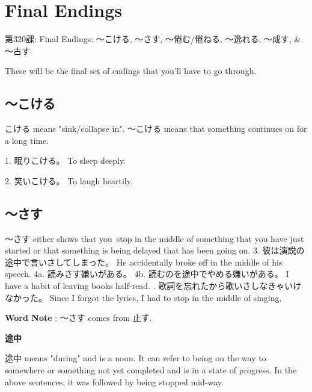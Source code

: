     
\chapter{Final Endings}

\begin{center}
\begin{Large}
第320課: Final Endings: ～こける, ～さす, ～倦む\slash 倦ねる, ～逸れる, ～成す, \& ～古す 
\end{Large}
\end{center}
 
\par{ These will be the final set of endings that you'll have to go through. }
      
\section{～こける}
 
\par{ こける means "sink\slash collapse in". ～こける means that something continues on for a long time. }

\par{1. 眠りこける。 \hfill\break
To sleep deeply. }

\par{2. 笑いこける。 \hfill\break
To laugh heartily. }
      
\section{～さす}
 
\par{ ～さす either shows that you stop in the middle of something that you have just started or that something is being delayed that has been going on. }
3. 彼は演説の途中で言いさしてしまった。 He accidentally broke off in the middle of his speech. \hfill\break
\hfill\break
4a. 読みさす嫌いがある。 4b. 読むのを途中でやめる嫌いがある。 I have a habit of leaving books half-read. \hfill\break
\hfill{}. 歌詞を忘れたから歌いさしなきゃいけなかった。 Since I forgot the lyrics, I had to stop in the middle of singing. 
\par{\textbf{Word Note }: ～さす comes from 止す. }

\begin{center}
 \textbf{途中 }
\end{center}

\par{ 途中 means "during" and is a noun. It can refer to being on the way to somewhere or something not yet completed and is in a state of progress. In the above sentences, it was followed by being stopped mid-way. }

